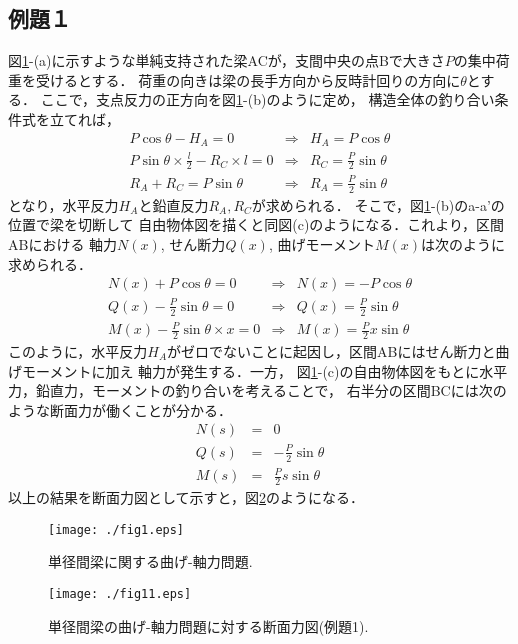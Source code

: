 ﻿\documentclass[10pt,a4j]{jbook}
\begin{document}
\subsection{例題１}
図\ref{fig:fig12_1}-(a)に示すような単純支持された梁ACが，支間中央の点Bで大きさ$P$の集中荷重を受けるとする．
荷重の向きは梁の長手方向から反時計回りの方向に$\theta$とする．
ここで，支点反力の正方向を図\ref{fig:fig12_1}-(b)のように定め，
構造全体の釣り合い条件式を立てれば，
\begin{eqnarray}
	P\cos\theta-H_A=0 & \Rightarrow & H_A=P\cos\theta \\
	P\sin\theta \times \frac{l}{2}-R_C\times l =0 & \Rightarrow & R_C=\frac{P}{2}\sin\theta \\
	R_A+R_C=P\sin\theta & \Rightarrow & R_A=\frac{P}{2}\sin\theta
\end{eqnarray}
となり，水平反力$H_A$と鉛直反力$R_A,R_C$が求められる．
そこで，図\ref{fig:fig12_1}-(b)のa-a'の位置で梁を切断して
自由物体図を描くと同図(c)のようになる．これより，区間ABにおける
軸力$N(x)$, せん断力$Q(x)$, 曲げモーメント$M(x)$は次のように求められる．
\begin{eqnarray}
	N(x)+P\cos\theta=0 & \Rightarrow & N(x)=-P\cos\theta \\
	Q(x)-\frac{P}{2}\sin\theta=0 & \Rightarrow & Q(x)=\frac{P}{2}\sin\theta \\
	M(x)-\frac{P}{2}\sin\theta\times x =0 & \Rightarrow & M(x)=\frac{P}{2}x\sin\theta
\end{eqnarray}
このように，水平反力$H_A$がゼロでないことに起因し，区間ABにはせん断力と曲げモーメントに加え
軸力が発生する．一方，
図\ref{fig:fig12_1}-(c)の自由物体図をもとに水平力，鉛直力，モーメントの釣り合いを考えることで，
右半分の区間BCには次のような断面力が働くことが分かる．
\begin{eqnarray}
	N(s)&=& 0 \\
	Q(s)&=&-\frac{P}{2}\sin\theta \\
	M(s)&=&\frac{P}{2}s \sin\theta
\end{eqnarray}
以上の結果を断面力図として示すと，図\ref{fig:fig12_1_1}のようになる．
\begin{figure}[h]
	\begin{center}
	\texttt{[image: ./fig1.eps]} 
	\end{center}
	\caption{
		単径間梁に関する曲げ-軸力問題.
	} 
	\label{fig:fig12_1}
\end{figure}
\begin{figure}[h]
	\begin{center}
	\texttt{[image: ./fig11.eps]} 
	\end{center}
	\caption{
		単径間梁の曲げ-軸力問題に対する断面力図(例題1).
	} 
	\label{fig:fig12_1_1}
\end{figure}
\end{document}
